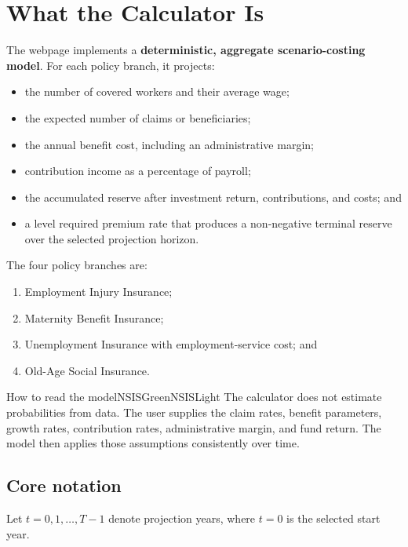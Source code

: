\section{What the Calculator Is}

The webpage implements a \textbf{deterministic, aggregate scenario-costing model}. For each policy branch, it projects:

\begin{itemize}
  \item the number of covered workers and their average wage;
  \item the expected number of claims or beneficiaries;
  \item the annual benefit cost, including an administrative margin;
  \item contribution income as a percentage of payroll;
  \item the accumulated reserve after investment return, contributions, and costs; and
  \item a level required premium rate that produces a non-negative terminal reserve over the selected projection horizon.
\end{itemize}

The four policy branches are:

\begin{enumerate}
  \item Employment Injury Insurance;
  \item Maternity Benefit Insurance;
  \item Unemployment Insurance with employment-service cost; and
  \item Old-Age Social Insurance.
\end{enumerate}

\begin{titledbox}{How to read the model}{NSISGreen}{NSISLight}
The calculator does not estimate probabilities from data. The user supplies the claim rates, benefit parameters, growth rates, contribution rates, administrative margin, and fund return. The model then applies those assumptions consistently over time.
\end{titledbox}

\subsection{Core notation}

Let $t=0,1,\ldots,T-1$ denote projection years, where $t=0$ is the selected start year.

